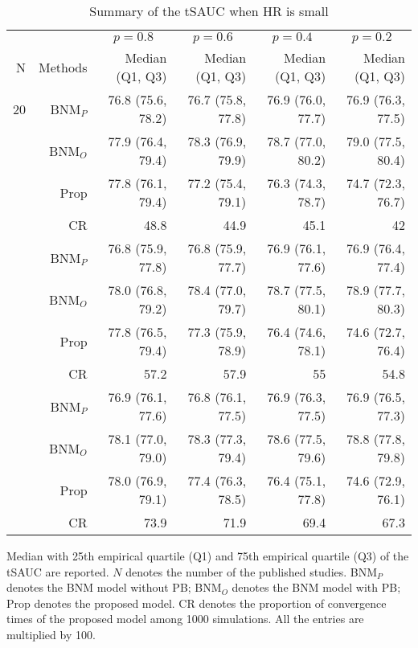 \begin{table}[!htb]

\caption{\label{tab:sauc.med.1}Summary of the tSAUC when HR is small}
\centering
\begin{threeparttable}
\begin{tabular}[t]{rrrrrr}
\toprule
\multicolumn{1}{c}{} & \multicolumn{1}{c}{} & \multicolumn{1}{c}{$p = 0.8$} & \multicolumn{1}{c}{$p = 0.6$} & \multicolumn{1}{c}{$p = 0.4$} & \multicolumn{1}{c}{$p = 0.2$} \\
\cmidrule(l{3pt}r{3pt}){3-3} \cmidrule(l{3pt}r{3pt}){4-4} \cmidrule(l{3pt}r{3pt}){5-5} \cmidrule(l{3pt}r{3pt}){6-6}
N & Methods & Median (Q1, Q3) & Median (Q1, Q3) & Median (Q1, Q3) & Median (Q1, Q3)\\
\midrule
20 & BNM$_P$ & 76.8 (75.6, 78.2) & 76.7 (75.8, 77.8) & 76.9 (76.0, 77.7) & 76.9 (76.3, 77.5)\\
 & BNM$_O$ & 77.9 (76.4, 79.4) & 78.3 (76.9, 79.9) & 78.7 (77.0, 80.2) & 79.0 (77.5, 80.4)\\
 & Prop & 77.8 (76.1, 79.4) & 77.2 (75.4, 79.1) & 76.3 (74.3, 78.7) & 74.7 (72.3, 76.7)\\
 & CR & 48.8 & 44.9 & 45.1 & 42\\
\addlinespace
30 & BNM$_P$ & 76.8 (75.9, 77.8) & 76.8 (75.9, 77.7) & 76.9 (76.1, 77.6) & 76.9 (76.4, 77.4)\\
 & BNM$_O$ & 78.0 (76.8, 79.2) & 78.4 (77.0, 79.7) & 78.7 (77.5, 80.1) & 78.9 (77.7, 80.3)\\
 & Prop & 77.8 (76.5, 79.4) & 77.3 (75.9, 78.9) & 76.4 (74.6, 78.1) & 74.6 (72.7, 76.4)\\
 & CR & 57.2 & 57.9 & 55 & 54.8\\
\addlinespace
50 & BNM$_P$ & 76.9 (76.1, 77.6) & 76.8 (76.1, 77.5) & 76.9 (76.3, 77.5) & 76.9 (76.5, 77.3)\\
 & BNM$_O$ & 78.1 (77.0, 79.0) & 78.3 (77.3, 79.4) & 78.6 (77.5, 79.6) & 78.8 (77.8, 79.8)\\
 & Prop & 78.0 (76.9, 79.1) & 77.4 (76.3, 78.5) & 76.4 (75.1, 77.8) & 74.6 (72.9, 76.1)\\
 & CR & 73.9 & 71.9 & 69.4 & 67.3\\
\bottomrule
\end{tabular}
\begin{tablenotes}
\item 
Median with 25th empirical quartile (Q1) and 75th empirical quartile (Q3) of the tSAUC are reported. 
$N$ denotes the number of the published studies. 
BNM$_P$ denotes the BNM model without PB; 
BNM$_O$ denotes the BNM model with PB;
Prop denotes the proposed model.
CR denotes the proportion of convergence times of the proposed model among 1000 simulations.
All the entries are multiplied by 100.
\end{tablenotes}
\end{threeparttable}
\end{table}
